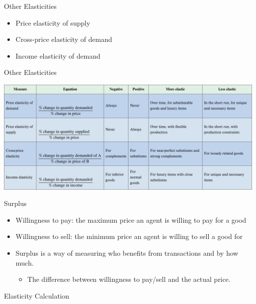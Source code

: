 \documentclass{beamer}
\begin{document}
\begin{frame}{Other Elasticities}
    \begin{itemize}
        \item Price elasticity of supply
        \item Cross-price elasticity of demand
        \item Income elasticity of demand
    \end{itemize}
\end{frame}

\begin{frame}{Other Elasticities}
    \begin{center}
        \includegraphics[scale=.3]{table}
    \end{center}
\end{frame}

\begin{frame}{Surplus}
    \begin{itemize}
        \item Willingness to pay: the maximum price an agent is willing to pay for a good
        \item Willingness to sell: the minimum price an agent is willing to sell a good for
        \item Surplus is a way of measuring who benefits from transactions and by how much. 
        \begin{itemize}
            \item The difference between willingness to pay/sell and the actual price.
        \end{itemize}
    \end{itemize}
\end{frame}

\begin{frame}{Elasticity Calculation}
\end{frame}
\end{document}

